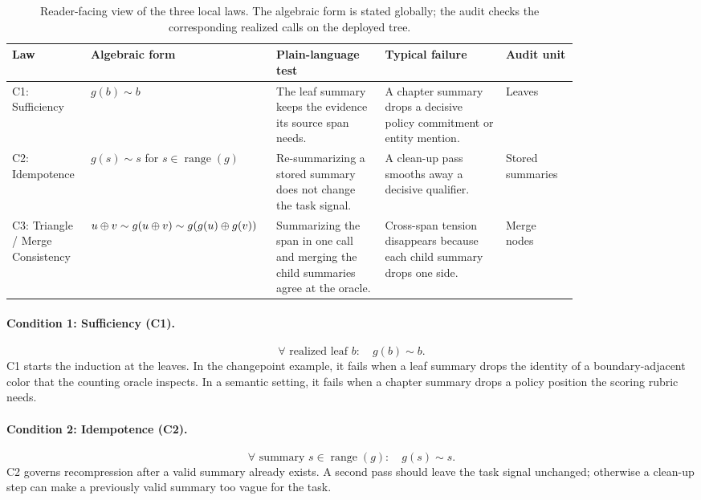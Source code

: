\begin{table}[htbp]
\centering\footnotesize
\setlength{\tabcolsep}{3pt}
\begin{tabular}{p{0.13\linewidth}p{0.19\linewidth}p{0.18\linewidth}p{0.20\linewidth}p{0.12\linewidth}}
\toprule
Law & Algebraic form & Plain-language test & Typical failure & Audit unit \\
\midrule
C1: Sufficiency & $g(b)\sim b$ & The leaf summary keeps the evidence its source span needs. & A chapter summary drops a decisive policy commitment or entity mention. & Leaves \\
C2: Idempotence & $g(s)\sim s$ for $s \in \operatorname{range}(g)$ & Re-summarizing a stored summary does not change the task signal. & A clean-up pass smooths away a decisive qualifier. & Stored summaries \\
C3: Triangle / Merge Consistency & $u \oplus v \sim g(u \oplus v) \sim g(g(u)\oplus g(v))$ & Summarizing the span in one call and merging the child summaries agree at the oracle. & Cross-span tension disappears because each child summary drops one side. & Merge nodes \\
\bottomrule
\end{tabular}
\caption{Reader-facing view of the three local laws. The algebraic form is stated globally; the audit checks the corresponding realized calls on the deployed tree.}
\label{tab:law-cards}
\end{table}

\paragraph{Condition 1: Sufficiency (C1).}
\begin{equation*}\tag{C1}\label{eq:leaf_sufficiency}
\forall \text{ realized leaf } b:\quad g(b) \sim b.
\end{equation*}
C1 starts the induction at the leaves. In the changepoint example, it fails when a leaf summary drops the identity of a boundary-adjacent color that the counting oracle inspects. In a semantic setting, it fails when a chapter summary drops a policy position the scoring rubric needs.

\paragraph{Condition 2: Idempotence (C2).}
\begin{equation*}\tag{C2}\label{eq:leaf_idempotence}
\forall \text{ summary } s \in \operatorname{range}(g):\quad g(s) \sim s.
\end{equation*}
C2 governs recompression after a valid summary already exists. A second pass should leave the task signal unchanged; otherwise a clean-up step can make a previously valid summary too vague for the task.

